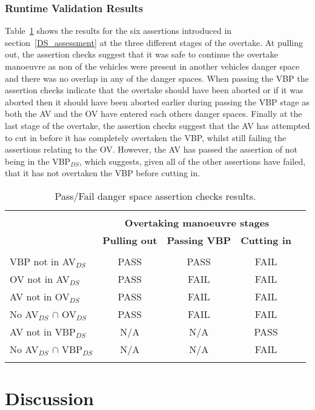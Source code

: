 \subsubsection{Runtime Validation Results}
Table~\ref{Overtaking_DS_table} shows the results for the six assertions introduced in section~\ref{DS_assessment} at the three different stages of the overtake. At pulling out, the assertion checks suggest that it was safe to continue the overtake manoeuvre as non of the vehicles were present in another vehicles danger space and there was no overlap in any of the danger spaces. 
When passing the VBP the assertion checks indicate that the overtake should have been aborted or if it was aborted then it should have been aborted earlier during passing the VBP stage as both the AV and the OV have entered each others danger spaces. Finally at the last stage of the overtake, the assertion checks suggest that the AV has attempted to cut in before it has completely overtaken the VBP, whilst still failing the assertions relating to the OV. However, the AV has passed the assertion of not being in the VBP$_{DS}$, which suggests, given all of the other assertions have failed, that it has not overtaken the VBP before cutting in.

\begin{table}
\centering
\begin{tabular}{ lcccc }
\hline
\\
\multirow{3}{*}{\textbf{}} & \multicolumn{3}{c}{\textbf{Overtaking manoeuvre stages}}\\
\textbf{Assertion} & \textbf{Pulling out} & \textbf{Passing VBP} & \textbf{Cutting in} & \\
&  &  &  & \\
VBP not in AV$_{DS}$ & PASS & PASS & FAIL\\
%
OV not in AV$_{DS}$ & PASS & FAIL & FAIL\\
%
AV not in OV$_{DS}$  & PASS & FAIL & FAIL\\
%
No AV$_{DS}$ $\cap$ OV$_{DS}$  & PASS & FAIL & FAIL\\
%
AV not in VBP$_{DS}$  & N/A & N/A & PASS\\
%
No AV$_{DS}$ $\cap$ VBP$_{DS}$  & N/A & N/A & FAIL\\
%
\\
\hline
\end{tabular}
\caption{Pass/Fail danger space assertion checks results.} \label{Overtaking_DS_table}
\end{table}

\section{Discussion} \label{discussion}

